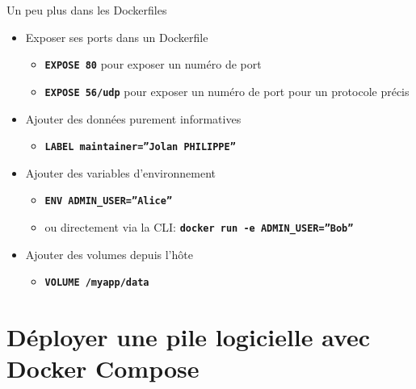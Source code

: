 \documentclass[aspectratio=169,10pt]{beamer}
\begin{document}

\begin{frame}{Un peu plus dans les Dockerfiles}

\begin{itemize}
    \item Exposer ses ports dans un Dockerfile
        \begin{itemize}
            \item \texttt{\textbf{EXPOSE 80}} pour exposer un numéro de port
            \item \texttt{\textbf{EXPOSE 56/udp}} pour exposer un numéro de port pour un protocole précis
        \end{itemize}
    \vspace{0.2cm}
    \item Ajouter des données purement informatives
        \begin{itemize}
            \item \texttt{\textbf{LABEL maintainer=”Jolan PHILIPPE”}}
        \end{itemize}
    \vspace{0.2cm}
    \item Ajouter des variables d’environnement
        \begin{itemize}
            \item \texttt{\textbf{ENV ADMIN\_USER=”Alice”}}
            \item ou directement via la CLI: \texttt{\textbf{docker run -e ADMIN\_USER=”Bob”}}
        \end{itemize}
    \vspace{0.2cm}
    \item Ajouter des volumes depuis l'hôte
        \begin{itemize}
            \item \texttt{\textbf{VOLUME /myapp/data}}
        \end{itemize}
\end{itemize}


\end{frame}

\section{Déployer une pile logicielle avec Docker Compose }
\end{document}
